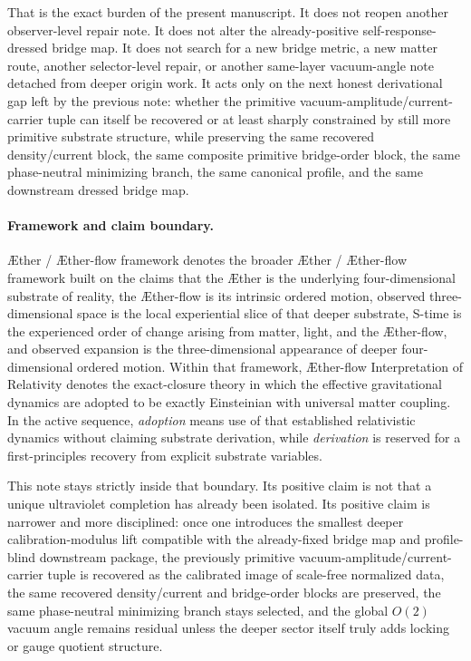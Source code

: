 \documentclass[11pt]{article}
\newcommand{\Aether}{\AE{}ther}
\newcommand{\Aflow}{\AE{}ther-flow}
\newcommand{\TheoryName}{\Aflow{} Interpretation of Relativity}
\newcommand{\TheoryProgram}{\Aether{} / \Aflow{} framework}
\begin{document}
That is the exact burden of the present manuscript. It does not reopen another observer-level repair note. It does not alter the already-positive self-response-dressed bridge map. It does not search for a new bridge metric, a new matter route, another selector-level repair, or another same-layer vacuum-angle note detached from deeper origin work. It acts only on the next honest derivational gap left by the previous note: whether the primitive vacuum-amplitude/current-carrier tuple can itself be recovered or at least sharply constrained by still more primitive substrate structure, while preserving the same recovered density/current block, the same composite primitive bridge-order block, the same phase-neutral minimizing branch, the same canonical profile, and the same downstream dressed bridge map.

\paragraph{Framework and claim boundary.}
\TheoryProgram{} denotes the broader \Aether{} / \Aflow{} framework built on the claims that the \Aether{} is the underlying four-dimensional substrate of reality, the \Aflow{} is its intrinsic ordered motion, observed three-dimensional space is the local experiential slice of that deeper substrate, S-time is the experienced order of change arising from matter, light, and the \Aflow{}, and observed expansion is the three-dimensional appearance of deeper four-dimensional ordered motion. Within that framework, \TheoryName{} denotes the exact-closure theory in which the effective gravitational dynamics are adopted to be exactly Einsteinian with universal matter coupling. In the active sequence, \emph{adoption} means use of that established relativistic dynamics without claiming substrate derivation, while \emph{derivation} is reserved for a first-principles recovery from explicit substrate variables.

This note stays strictly inside that boundary. Its positive claim is not that a unique ultraviolet completion has already been isolated. Its positive claim is narrower and more disciplined: once one introduces the smallest deeper calibration-modulus lift compatible with the already-fixed bridge map and profile-blind downstream package, the previously primitive vacuum-amplitude/current-carrier tuple is recovered as the calibrated image of scale-free normalized data, the same recovered density/current and bridge-order blocks are preserved, the same phase-neutral minimizing branch stays selected, and the global \(O(2)\) vacuum angle remains residual unless the deeper sector itself truly adds locking or gauge quotient structure.
\end{document}
